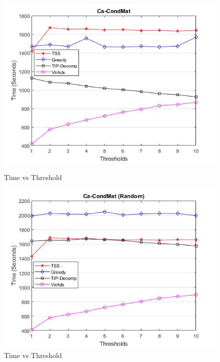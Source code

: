 \begin{figure}[h!]
\begin{minipage}[t]{0.50\textwidth}
\includegraphics[width=\linewidth,keepaspectratio=true]{images/ca-condmattime.jpg}
\caption{Time vs Threshold}

\end{minipage}
\begin{minipage}[t]{0.50\textwidth}
\includegraphics[width=\linewidth,keepaspectratio=true]{images/ca-condmatrandomtime.jpg}
\caption{Time vs Threshold}
\end{minipage}
\end{figure}


